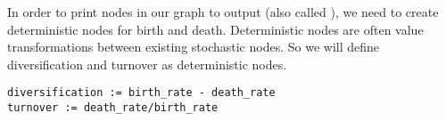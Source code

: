 In order to print nodes in our graph to output (also called ), we need to create deterministic nodes for birth and death. Deterministic nodes are often value transformations between existing stochastic nodes. So we will define diversification and turnover as deterministic nodes.

{\tt \begin{snugshade*}
\begin{lstlisting}
diversification := birth_rate - death_rate
turnover := death_rate/birth_rate
\end{lstlisting}
\end{snugshade*}}






%
%
